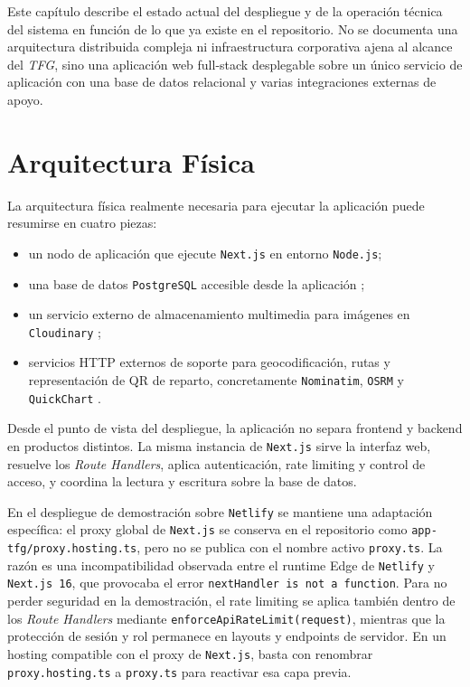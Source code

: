 Este capítulo describe el estado actual del despliegue y de la operación técnica del sistema en función de lo que ya existe en el repositorio. No se documenta una arquitectura distribuida compleja ni infraestructura corporativa ajena al alcance del \textit{TFG}, sino una aplicación web full-stack desplegable sobre un único servicio de aplicación con una base de datos relacional y varias integraciones externas de apoyo.

\section{Arquitectura Física}

La arquitectura física realmente necesaria para ejecutar la aplicación puede resumirse en cuatro piezas:

\begin{itemize}
    \item un nodo de aplicación que ejecute \texttt{Next.js} en entorno \texttt{Node.js};
    \item una base de datos \texttt{PostgreSQL} accesible desde la aplicación \citep{postgresdocs2026};
    \item un servicio externo de almacenamiento multimedia para imágenes en \texttt{Cloudinary} \citep{cloudinaryupload2026};
    \item servicios HTTP externos de soporte para geocodificación, rutas y representación de QR de reparto, concretamente \texttt{Nominatim}, \texttt{OSRM} y \texttt{QuickChart} \citep{nominatimapi2026,osrmdocs2026,quickchartqr2026}.
\end{itemize}

Desde el punto de vista del despliegue, la aplicación no separa frontend y backend en productos distintos. La misma instancia de \texttt{Next.js} sirve la interfaz web, resuelve los \textit{Route Handlers}, aplica autenticación, rate limiting y control de acceso, y coordina la lectura y escritura sobre la base de datos.

En el despliegue de demostración sobre \texttt{Netlify} se mantiene una adaptación específica: el proxy global de \texttt{Next.js} se conserva en el repositorio como \texttt{app-tfg/proxy.hosting.ts}, pero no se publica con el nombre activo \texttt{proxy.ts}. La razón es una incompatibilidad observada entre el runtime Edge de \texttt{Netlify} y \texttt{Next.js 16}, que provocaba el error \texttt{nextHandler is not a function}. Para no perder seguridad en la demostración, el rate limiting se aplica también dentro de los \textit{Route Handlers} mediante \texttt{enforceApiRateLimit(request)}, mientras que la protección de sesión y rol permanece en layouts y endpoints de servidor. En un hosting compatible con el proxy de \texttt{Next.js}, basta con renombrar \texttt{proxy.hosting.ts} a \texttt{proxy.ts} para reactivar esa capa previa.

